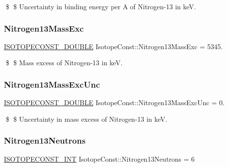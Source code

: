 \$ \$ Uncertainty in binding energy per A of Nitrogen-\/13 in keV. \mbox{\label{group___isotope_const-_nitrogen-_n13_ga0d0e3ad2d8a4ab34fd9c89937800bfae}} 
\subsubsection{\texorpdfstring{Nitrogen13\+Mass\+Exc}{Nitrogen13MassExc}}
{\footnotesize\ttfamily \mbox{\hyperlink{group___isotope_const-_macros_ga8f45a7272ce02c0b4c65c44636ed719a}{I\+S\+O\+T\+O\+P\+E\+C\+O\+N\+S\+T\+\_\+\+D\+O\+U\+B\+LE}} Isotope\+Const\+::\+Nitrogen13\+Mass\+Exc = 5345.}

\$ \$ Mass excess of Nitrogen-\/13 in keV. \mbox{\label{group___isotope_const-_nitrogen-_n13_ga4d27c9a64afbc433996a0c14f9108e09}} 
\subsubsection{\texorpdfstring{Nitrogen13\+Mass\+Exc\+Unc}{Nitrogen13MassExcUnc}}
{\footnotesize\ttfamily \mbox{\hyperlink{group___isotope_const-_macros_ga8f45a7272ce02c0b4c65c44636ed719a}{I\+S\+O\+T\+O\+P\+E\+C\+O\+N\+S\+T\+\_\+\+D\+O\+U\+B\+LE}} Isotope\+Const\+::\+Nitrogen13\+Mass\+Exc\+Unc = 0.}

\$ \$ Uncertainty in mass excess of Nitrogen-\/13 in keV. \mbox{\label{group___isotope_const-_nitrogen-_n13_ga8ccf15f7b366001fcc4a983f66f487c4}} 
\subsubsection{\texorpdfstring{Nitrogen13\+Neutrons}{Nitrogen13Neutrons}}
{\footnotesize\ttfamily \mbox{\hyperlink{group___isotope_const-_macros_ga5f18360b3e99483a35c32d789e62621c}{I\+S\+O\+T\+O\+P\+E\+C\+O\+N\+S\+T\+\_\+\+I\+NT}} Isotope\+Const\+::\+Nitrogen13\+Neutrons = 6}

